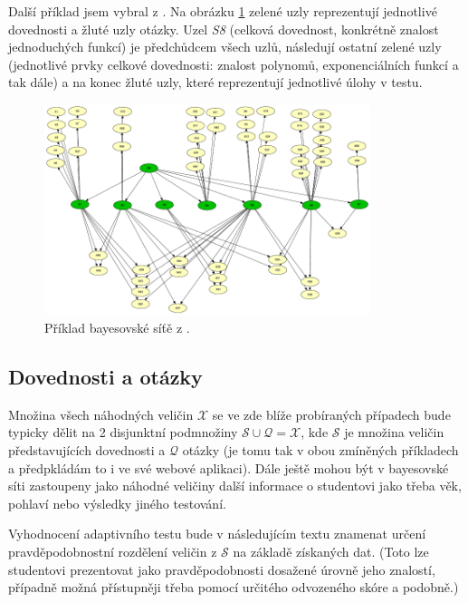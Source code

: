 \documentclass[a4paper,twoside,12pt]{scrbook}
\begin{document}
Další příklad jsem vybral z \cite{plajner16}. Na obrázku \ref{fig:complex_BN_plajner16} zelené uzly reprezentují jednotlivé dovednosti a žluté uzly otázky. Uzel \emph{S8} (celková dovednost, konkrétně znalost jednoduchých funkcí) je předchůdcem všech uzlů, následují ostatní zelené uzly (jednotlivé prvky celkové dovednosti: znalost polynomů, exponenciálních funkcí a tak dále) a na konec žluté uzly, které reprezentují jednotlivé úlohy v testu.

\begin{figure}
  \centering
    \includegraphics[width=0.85\textwidth]{complex_BN_plajner16.pdf}
  \caption{Příklad bayesovské síťě z \cite{plajner16}.}
  \label{fig:complex_BN_plajner16}
\end{figure}

\subsection{Dovednosti a otázky}
Množina všech náhodných veličin $\mathcal{X}$ se ve zde blíže probíraných případech bude typicky dělit na 2 disjunktní podmnožiny $\mathcal{S} \cup \mathcal{Q} = \mathcal{X}$, kde $\mathcal{S}$ je množina veličin představujících dovednosti a $\mathcal{Q}$ otázky (je tomu tak v obou zmíněných příkladech a předpkládám to i ve své webové aplikaci). Dále ještě mohou být v bayesovské síti zastoupeny jako náhodné veličiny další informace o studentovi jako třeba věk, pohlaví nebo výsledky jiného testování.

Vyhodnocení adaptivního testu bude v následujícím textu znamenat určení pravděpodobnostní rozdělení veličin z $\mathcal{S}$ na základě získaných dat. (Toto lze studentovi prezentovat jako pravděpodobnosti dosažené úrovně jeho znalostí, případně možná přístupněji třeba pomocí určitého odvozeného skóre a podobně.)
\end{document}
